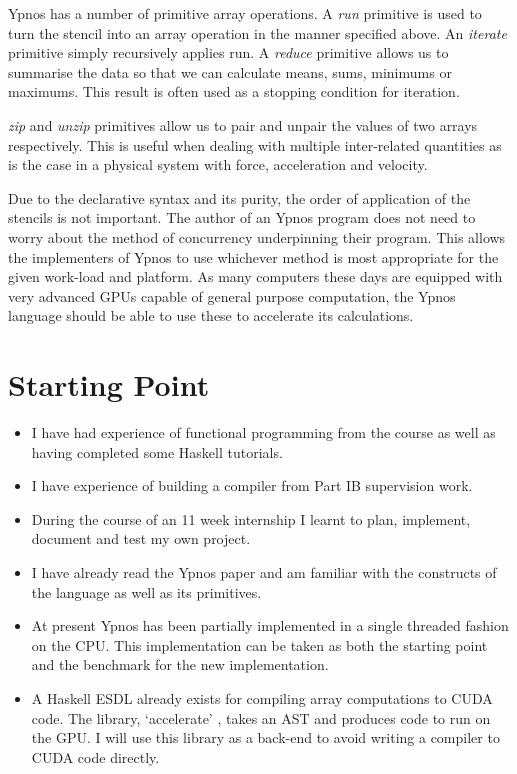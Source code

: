 Ypnos has a number of primitive array operations. A \emph{run} primitive is 
used to turn the stencil into an array operation in the manner specified above.  
An \emph{iterate} primitive simply recursively applies run.  A \emph{reduce} 
primitive allows us to summarise the data so that we can calculate means, sums, 
minimums or maximums.  This result is often used as a stopping condition for 
iteration.

\emph{zip} and \emph{unzip} primitives allow us to pair and unpair the values 
of two arrays respectively. This is useful when dealing with multiple 
inter-related quantities as is the case in a physical system with force, 
acceleration and velocity.

Due to the declarative syntax and its purity, the order of application of the 
stencils is not important. The author of an Ypnos program does not need to 
worry about the method of concurrency underpinning their program. This allows 
the implementers of Ypnos to use whichever method is most appropriate for the 
given work-load and platform. As many computers these days are equipped with 
very advanced GPUs capable of general purpose computation, the Ypnos language 
should be able to use these to accelerate its calculations.

\section*{Starting Point}

\begin{itemize}

\item I have had experience of functional programming from the course as well 
as having completed some Haskell tutorials. 

\item I have experience of building a compiler from Part IB supervision work.

\item During the course of an 11 week internship I learnt to plan, implement, 
document and test my own project.

\item I have already read the Ypnos paper and am familiar with the constructs 
of the language as well as its primitives.

\item At present Ypnos has been partially implemented in a single threaded 
fashion on the CPU. This implementation can be taken as both the starting point 
and the benchmark for the new implementation.

\item A Haskell ESDL already exists for compiling array computations to CUDA 
code. The library, `accelerate' \cite{accel}, takes an AST and produces code
to run on the GPU.  I will use this library as a back-end to avoid writing a 
compiler to CUDA code directly.

\end{itemize}

